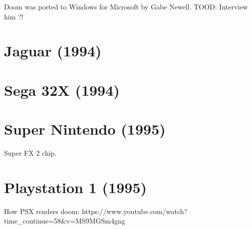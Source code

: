 Doom was ported to Windows for Microsoft by Gabe Newell. TOOD: Interview him ?!
\section{Jaguar (1994)}
\section{Sega 32X (1994)}
\section{Super Nintendo (1995)}
Super FX 2 chip.
\section{Playstation 1 (1995)}
How PSX renders doom: https://www.youtube.com/watch?time\_continue=58\&v=MS9MGSm4gng\\
\par
